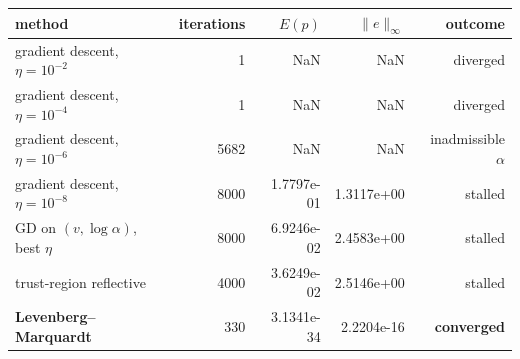\begin{tabular}{lrrrr}
\toprule
method & iterations & $E(p)$ & $\|e\|_\infty$ & outcome \\
\midrule
gradient descent, $\eta=10^{-2}$ & 1 & NaN & NaN & diverged \\
gradient descent, $\eta=10^{-4}$ & 1 & NaN & NaN & diverged \\
gradient descent, $\eta=10^{-6}$ & 5682 & NaN & NaN & inadmissible $\alpha$ \\
gradient descent, $\eta=10^{-8}$ & 8000 & 1.7797e-01 & 1.3117e+00 & stalled \\
GD on $(v,\log\alpha)$, best $\eta$ & 8000 & 6.9246e-02 & 2.4583e+00 & stalled \\
trust-region reflective & 4000 & 3.6249e-02 & 2.5146e+00 & stalled \\
\textbf{Levenberg--Marquardt} & 330 & 3.1341e-34 & 2.2204e-16 & \textbf{converged} \\
\bottomrule
\end{tabular}
